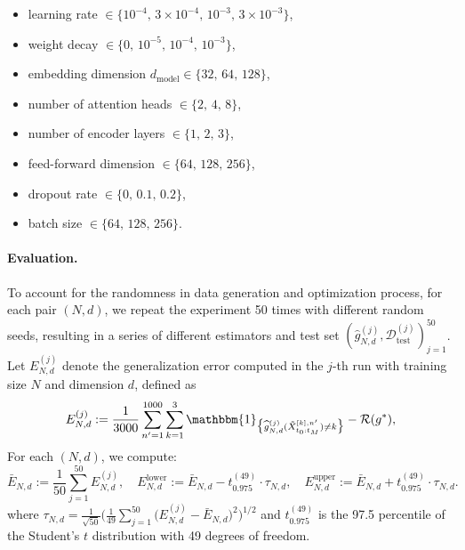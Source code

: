 \documentclass{article}
\theoremstyle{plain}
\theoremstyle{definition}
\theoremstyle{remark}
\newcommand{\calR}{\mathcal{R}}
\begin{document}
\begin{itemize}

    \item learning rate $\in \{10^{-4},\, 3\times10^{-4},\, 10^{-3},\, 3\times10^{-3}\}$,

    \item weight decay $\in\{0,\, 10^{-5},\, 10^{-4},\, 10^{-3}\}$,

    \item embedding dimension $d_{\mathrm{model}}\in\{32,\,64,\,128\}$,

    \item number of attention heads $\in\{2,\,4,\,8\}$,

    \item number of encoder layers $\in\{1,\,2,\,3\}$,

    \item feed-forward dimension $\in\{64,\,128,\,256\}$,

    \item dropout rate $\in\{0,\,0.1,\,0.2\}$,

    \item batch size $\in\{64,\,128,\,256\}$.

\end{itemize}


\paragraph{Evaluation.}
To account for the randomness in data generation and optimization process, for each pair $(N, d)$, we repeat the experiment 50 times with different random seeds, resulting in a series of different estimators and test set $(\widehat{g}_{N,d}^{(j)}, \mathcal{D}_{\text{test}}^{(j)})_{j=1}^{50}$. Let $E_{N,d}^{(j)}$ denote the generalization error computed in the $j$-th run with training size $N$ and dimension $d$, defined as 
$$E_{N,d}^{(j)} := \frac{1}{3000}\sum_{n'=1}^{1000} \sum_{k=1}^{3}\mathbbm{1}_{\big\{\widehat{g}_{N,d}^{(j)}(\tilde X^{[k], n'}_{t_0:t_M} )\neq k \big\}}-\calR(g^*),$$
For each $(N, d)$, we compute:
\begin{equation}
\label{eq:minmax-interval}
\bar{E}_{N,d} := \frac{1}{50} \sum_{j=1}^{50} E_{N,d}^{(j)}, \quad
E_{N,d}^{\text{lower}} := \bar{E}_{N,d} - t_{0.975}^{(49)} \cdot \tau_{N,d}, \quad
E_{N,d}^{\text{upper}} := \bar{E}_{N,d} + t_{0.975}^{(49)} \cdot \tau_{N,d}.
\end{equation}
where $\tau_{N,d} = \frac{1}{\sqrt{50}} \big( \frac{1}{49} \sum_{j=1}^{50} \big(E_{N,d}^{(j)} - \bar{E}_{N,d} \big)^2 \big)^{1/2}$ and $t_{0.975}^{(49)}$ is the 97.5 percentile of the Student’s $t$ distribution with 49 degrees of freedom. 
\end{document}
